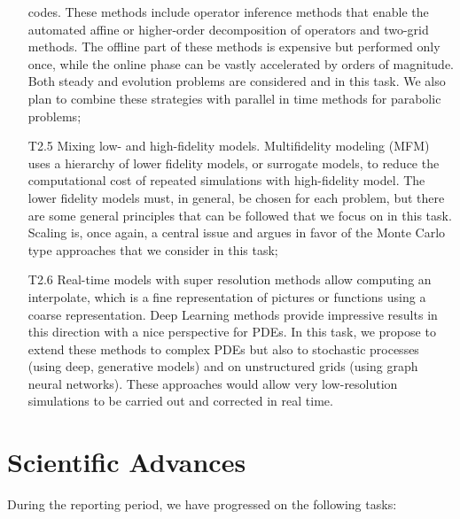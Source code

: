 \begin{itemize}
  codes. These methods include  operator inference methods that enable
  the automated affine or  higher-order decomposition of operators and
  two-grid methods. The offline part of these methods is expensive but
  performed  only  once,   while  the  online  phase   can  be  vastly
  accelerated  by  orders  of  magnitude. Both  steady  and  evolution
  problems are considered  and in this task.  We also  plan to combine
  these  strategies  with  parallel  in  time  methods  for  parabolic
  problems;
\item[T2.5]  Mixing  low-  and  high-fidelity  models.   Multifidelity
  modeling  (MFM)  uses  a  hierarchy of  lower  fidelity  models,  or
  surrogate  models,  to reduce  the  computational  cost of  repeated
  simulations  with high-fidelity  model.  The  lower fidelity  models
  must, in  general, be chosen  for each  problem, but there  are some
  general principles  that can be  followed that  we focus on  in this
  task. Scaling is, once again, a central issue and argues in favor of
  the Monte Carlo type approaches that we consider in this task;
\item[T2.6]  Real-time  models  with super  resolution  methods  allow
  computing an interpolate, which is a fine representation of pictures
  or functions  using a  coarse representation. Deep  Learning methods
  provide impressive results in this direction with a nice perspective
  for  PDEs.  In  this task,  we propose  to extend  these methods  to
  complex  PDEs   but  also  to  stochastic   processes  (using  deep,
  generative  models) and  on unstructured  grids (using  graph neural
  networks).   These   approaches  would  allow   very  low-resolution
  simulations to be carried out and corrected in real time.
\end{itemize}  

\section{Scientific Advances}

During the reporting period, we have progressed on the following tasks: 

